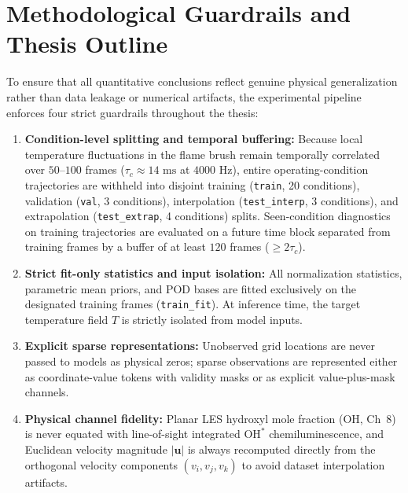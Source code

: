 \section{Methodological Guardrails and Thesis Outline}
\label{sec:intro_outline}

To ensure that all quantitative conclusions reflect genuine physical generalization rather than data leakage or numerical artifacts, the experimental pipeline enforces four strict guardrails throughout the thesis:
\begin{enumerate}
    \item \textbf{Condition-level splitting and temporal buffering:} Because local temperature fluctuations in the flame brush remain temporally correlated over $50\text{--}100$ frames ($\tau_c \approx 14\text{ ms}$ at $4000\text{ Hz}$), entire operating-condition trajectories are withheld into disjoint training (\texttt{train}, 20 conditions), validation (\texttt{val}, 3 conditions), interpolation (\texttt{test\_interp}, 3 conditions), and extrapolation (\texttt{test\_extrap}, 4 conditions) splits. Seen-condition diagnostics on training trajectories are evaluated on a future time block separated from training frames by a buffer of at least $120$ frames ($\ge 2\tau_c$).
    \item \textbf{Strict fit-only statistics and input isolation:} All normalization statistics, parametric mean priors, and POD bases are fitted exclusively on the designated training frames (\texttt{train\_fit}). At inference time, the target temperature field $T$ is strictly isolated from model inputs.
    \item \textbf{Explicit sparse representations:} Unobserved grid locations are never passed to models as physical zeros; sparse observations are represented either as coordinate-value tokens with validity masks or as explicit value-plus-mask channels.
    \item \textbf{Physical channel fidelity:} Planar LES hydroxyl mole fraction ($\text{OH}$, Ch~8) is never equated with line-of-sight integrated $\text{OH}^*$ chemiluminescence, and Euclidean velocity magnitude $|\mathbf{u}|$ is always recomputed directly from the orthogonal velocity components $(v_i, v_j, v_k)$ to avoid dataset interpolation artifacts.
\end{enumerate}

